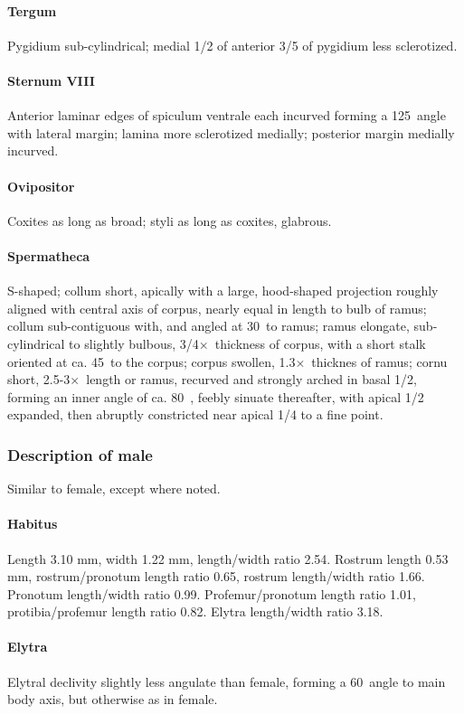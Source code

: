 \documentclass[fleqn,10pt,lineno]{wlpeerj} %
\newcommand{\td}{\textdegree~}
\newcommand{\x}{$\times$~}
\begin{document}
			\paragraph{Tergum}
				Pygidium sub-cylindrical; medial 1/2 of anterior 3/5 of pygidium less sclerotized.
			\paragraph{Sternum VIII}
				Anterior laminar edges of spiculum ventrale each incurved forming a 125\td angle with lateral margin; lamina more sclerotized medially; posterior margin medially incurved.
			\paragraph{Ovipositor}
				Coxites as long as broad; styli as long as coxites, glabrous.
			\paragraph{Spermatheca}
				S-shaped; collum short, apically with a large, hood-shaped projection roughly aligned with central axis of corpus, nearly equal in length to bulb of ramus; collum sub-contiguous with, and angled at 30\td to ramus; ramus elongate, sub-cylindrical to slightly bulbous, 3/4\x thickness of corpus, with a short stalk oriented at ca. 45\td to the corpus; corpus swollen, 1.3\x thicknes of ramus; cornu short, 2.5-3\x length or ramus, recurved and strongly arched in basal 1/2, forming an inner angle of ca. 80\td, feebly sinuate thereafter, with apical 1/2 expanded, then abruptly constricted near apical 1/4 to a fine point.
		\subsubsection*{Description of male}
			Similar to female, except where noted.
			\paragraph{Habitus}
				Length 3.10 mm, width 1.22 mm, length/width ratio 2.54. Rostrum length 0.53 mm, rostrum/pronotum length ratio 0.65, rostrum length/width ratio 1.66. Pronotum length/width ratio 0.99. Profemur/pronotum length ratio 1.01, protibia/profemur length ratio 0.82. Elytra length/width ratio 3.18.
			\paragraph{Elytra}
				Elytral declivity slightly less angulate than female, forming a 60\td angle to main body axis, but otherwise as in female.
\end{document}
